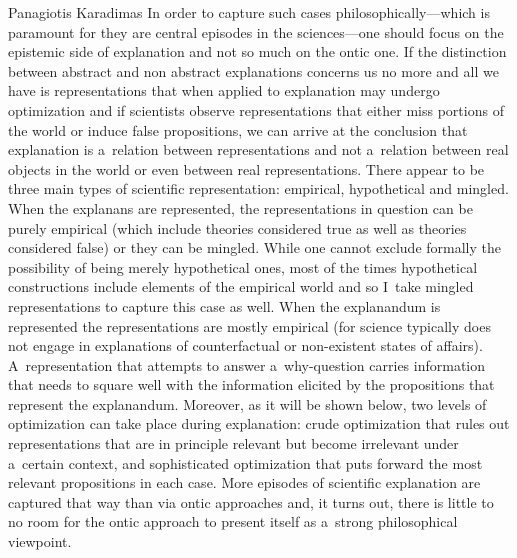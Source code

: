 \begin{artengenv}{Panagiotis Karadimas}
In order to capture such cases philosophically---which is paramount for they are central episodes in the sciences---one should focus on the epistemic side of explanation and not so much on the ontic one. If the distinction between abstract and non abstract explanations concerns us no more and all we have is representations that when applied to explanation may undergo optimization and if scientists observe representations that either miss portions of the world or induce false propositions, we can arrive at the conclusion that explanation is a~relation between representations and not a~relation between real objects in the world or even between real representations. There appear to be three main types of scientific representation: empirical, hypothetical and mingled. When the explanans are represented, the representations in question can be purely empirical (which include theories considered true as well as theories considered false) or they can be mingled. While one cannot exclude formally the possibility of being merely hypothetical ones, most of the times hypothetical constructions include elements of the empirical world and so I~take mingled representations to capture this case as well. When the explanandum is represented the representations are mostly empirical (for science typically does not engage in explanations of counterfactual or non-existent states of affairs). A~representation that attempts to answer a~why-question carries information that needs to square well with the information elicited by the propositions that represent the explanandum. Moreover, as it will be shown below, two levels of optimization can take place during explanation: crude optimization that rules out representations that are in principle relevant but become irrelevant under a~certain context, and sophisticated optimization that puts forward the most relevant propositions in each case. More episodes of scientific explanation are captured that way than via ontic approaches and, it turns out, there is little to no room for the ontic approach to present itself as a~strong philosophical viewpoint.


\end{artengenv}
